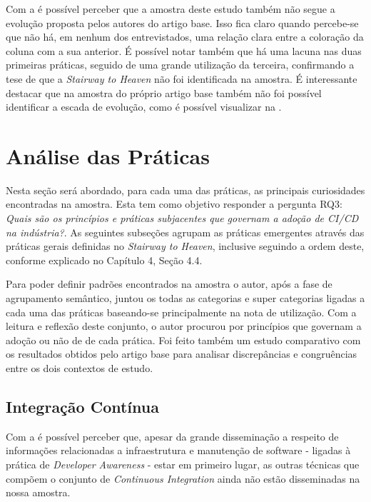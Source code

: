 Com a  é possível perceber que a amostra deste estudo também não segue a evolução proposta pelos autores do artigo base. Isso fica claro quando percebe-se que não há, em nenhum dos entrevistados, uma relação clara entre a coloração da coluna com a sua anterior. É possível notar também que há uma lacuna nas duas primeiras práticas, seguido de uma grande utilização da terceira, confirmando a tese de que a \emph{Stairway to Heaven} não foi identificada na amostra. É interessante destacar que na amostra do próprio artigo base também não foi possível identificar a escada de evolução, como é possível visualizar na .

\section{Análise das Práticas}

Nesta seção será abordado, para cada uma das práticas, as principais curiosidades encontradas na amostra. Esta tem como objetivo responder a pergunta RQ3: \emph{Quais são os princípios e práticas subjacentes que governam a adoção de CI/CD na indústria?}. As seguintes subseções agrupam as práticas emergentes através das práticas gerais definidas no \emph{Stairway to Heaven}, inclusive seguindo a ordem deste, conforme explicado no Capítulo 4, Seção 4.4.

Para poder definir padrões encontrados na amostra o autor, após a fase de agrupamento semântico, juntou os todas as categorias e super categorias ligadas a cada uma das práticas baseando-se principalmente na nota de utilização. Com a leitura e reflexão deste conjunto, o autor procurou por princípios que governam a adoção ou não de de cada prática. Foi feito também um estudo comparativo com os resultados obtidos pelo artigo base para analisar discrepâncias e congruências entre os dois contextos de estudo.

\subsection{Integração Contínua}

Com a  é possível perceber que, apesar da grande disseminação a respeito de informações relacionadas a infraestrutura e manutenção de software - ligadas à prática de \emph{Developer Awareness} \cite{awa} - estar em primeiro lugar, as outras técnicas que compõem o conjunto de \emph{Continuous Integration} ainda não estão disseminadas na nossa amostra.

